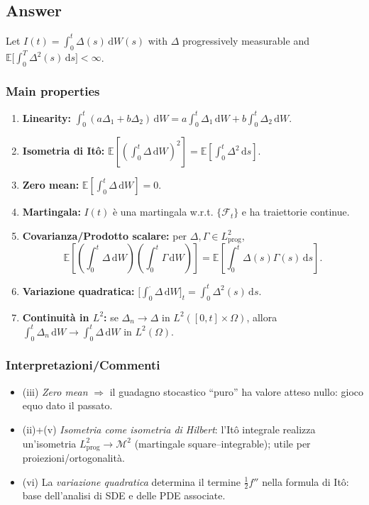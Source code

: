 \documentclass[12pt,a4paper]{book}
\theoremstyle{remark}
\newcommand{\EE}{\mathbb{E}}          %
\newcommand{\F}{\mathcal{F}}          %
\newcommand{\dd}{\mathrm{d}}
\begin{document}
\subsection*{Answer}

Let $I(t)=\int_0^t \Delta(s)\,\dd W(s)$ with $\Delta$ progressively measurable and $\EE\!\big[\int_0^T \Delta^2(s)\,\dd s\big]<\infty$.

\subsubsection*{Main properties}
\begin{enumerate}[label=\roman*)]
\item \textbf{Linearity:} $\displaystyle \int_0^t (a\Delta_1+b\Delta_2)\,\dd W = a\int_0^t \Delta_1\,\dd W + b\int_0^t \Delta_2\,\dd W.$
\item \textbf{Isometria di It\^o:} $\displaystyle \EE\!\left[\left(\int_0^t \Delta\,\dd W\right)^2\right]=\EE\!\left[\int_0^t \Delta^2\,\dd s\right].$
\item \textbf{Zero mean:} $\displaystyle \EE\!\left[\int_0^t \Delta\,\dd W\right]=0.$
\item \textbf{Martingala:} $I(t)$ è una martingala w.r.t. $\{\F_t\}$ e ha traiettorie continue.
\item \textbf{Covarianza/Prodotto scalare:} per $\Delta,\Gamma\in L^2_{\text{prog}}$,
\[
\EE\!\left[\left(\int_0^t \Delta\,\dd W\right)\!\left(\int_0^t \Gamma\,\dd W\right)\right]
=\EE\!\left[\int_0^t \Delta(s)\Gamma(s)\,\dd s\right].
\]
\item \textbf{Variazione quadratica:} $\displaystyle \big[\textstyle\int_0^\cdot \Delta\,\dd W\big]_t=\int_0^t \Delta^2(s)\,\dd s.$
\item \textbf{Continuit\`a in $L^2$:} se $\Delta_n\to\Delta$ in $L^2([0,t]\times\Omega)$, allora $\int_0^t \Delta_n\,\dd W \to \int_0^t \Delta\,\dd W$ in $L^2(\Omega)$.
\end{enumerate}

\subsubsection*{Interpretazioni/Commenti}
\begin{itemize}
\item (iii) \emph{Zero mean} $\Rightarrow$ il guadagno stocastico “puro” ha valore atteso nullo: gioco equo dato il passato.
\item (ii)+(v) \emph{Isometria come isometria di Hilbert}: l’It\^o integrale realizza un’isometria $L^2_{\text{prog}} \to \mathcal{M}^2$ (martingale square–integrable); utile per proiezioni/ortogonalit\`a.
\item (vi) La \emph{variazione quadratica} determina il termine $\tfrac12 f''$ nella formula di It\^o: base dell’analisi di SDE e delle PDE associate.
\end{itemize}
\end{document}

